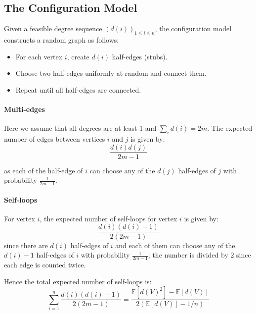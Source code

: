 \documentclass{article}
\begin{document}



\subsection{The Configuration Model}  
Given a feasible degree sequence $(d(i))_{1\leq i \leq n}$, the configuration model constructs a random graph as follows: 
\begin{itemize}
    \item For each vertex $i$, create $d(i)$ half-edges (stubs).
    \item Choose two half-edges uniformly at random and connect them.
    \item Repeat until all half-edges are connected.
\end{itemize}

\paragraph{Multi-edges} Here we assume that all degrees are at least $1$ and $\sum_i d(i) = 2m$. The expected number of edges between vertices $i$ and $j$ is given by:
\begin{equation*}
    \frac{d(i)d(j)}{2m-1}
\end{equation*}

as each of the half-edge of $i$ can choose any of the $d(j)$ half-edges of $j$ with probability $\frac{1}{2m-1}$.  

\paragraph{Self-loops} For vertex $i$, the expected number of self-loops for vertex $i$ is given by:
\begin{equation*}
    \frac{d(i) (d(i)-1)}{2(2m-1)}
\end{equation*}
since there are $d(i)$ half-edges of $i$ and each of them can choose any of the $d(i)-1$ half-edges of $i$ with probability $\frac{1}{2m-1}$; the number is divided by $2$ since each edge is counted twice.  

Hence the total expected number of self-loops is:
\begin{equation*}
    \sum_{i=1}^{n}\frac{d(i)(d(i)-1)}{2(2m-1)}=\frac{\mathbb{E}[d(V)^{2}]-\mathbb{E}[d(V)]}{2(\mathbb{E}[d(V)]-1/n)}
\end{equation*}
\end{document}
